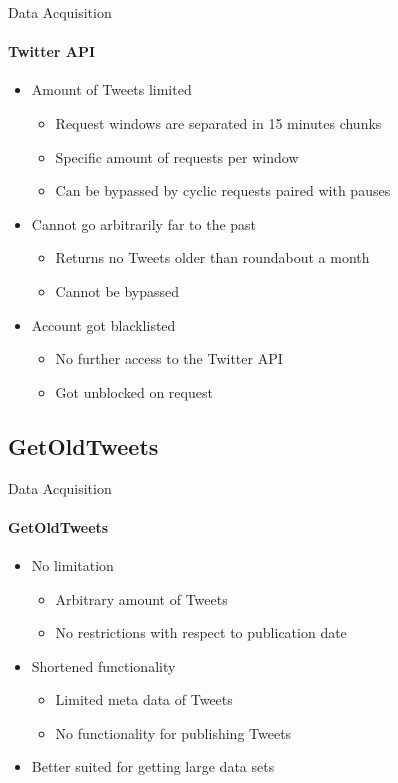 \documentclass{beamer}
\begin{document}
\begin{frame}{Data Acquisition}
\framesubtitle{Twitter API}
\begin{itemize}
\item Amount of Tweets limited
	\begin{itemize}
	\item Request windows are separated in 15 minutes chunks
	\item Specific amount of requests per window
	\item Can be bypassed by cyclic requests paired with pauses
	\end{itemize}
\vspace{5mm}
\item<2-> Cannot go arbitrarily far to the past
	\begin{itemize}
	\item Returns no Tweets older than roundabout a month
	\item Cannot be bypassed
	\end{itemize}
\vspace{5mm}
\item<3-> Account got blacklisted
	\begin{itemize}
	\item No further access to the Twitter API
	\item Got unblocked on request
	\end{itemize}
\end{itemize}
\end{frame}

\subsection{GetOldTweets}

\begin{frame}{Data Acquisition}
\framesubtitle{GetOldTweets}
\begin{itemize}
\item No limitation
	\begin{itemize}
	\item Arbitrary amount of Tweets
	\item No restrictions with respect to publication date
	\end{itemize}
\vspace{5mm}
\item<2-> Shortened functionality
	\begin{itemize}
	\item Limited meta data of Tweets
	\item No functionality for publishing Tweets
	\end{itemize}
\vspace{5mm}
\item<3-> Better suited for getting large data sets
\end{itemize}
\end{frame}
\end{document}
